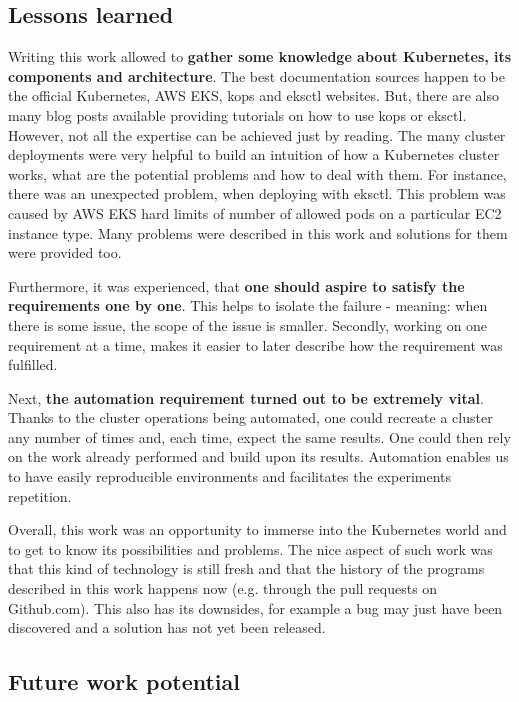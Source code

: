 \subsection{Lessons learned}

Writing this work allowed to \textbf{gather some knowledge about Kubernetes, its components and architecture}. The best documentation sources happen to be the official Kubernetes, AWS EKS, kops and eksctl websites. But, there are also many blog posts available providing tutorials on how to use kops or eksctl. However, not all the expertise can be achieved just by reading. The many cluster deployments were very helpful to build an intuition of how a Kubernetes cluster works, what are the potential problems and how to deal with them. For instance, there was an unexpected problem, when deploying with eksctl. This problem was caused by AWS EKS hard limits of number of  allowed pods on a particular EC2 instance type. Many problems were described in this work and solutions for them were provided too.

Furthermore, it was experienced, that \textbf{one should aspire to satisfy the requirements one by one}. This helps to isolate the failure - meaning: when there is some issue, the scope of the issue is smaller. Secondly, working on one requirement at a time, makes it easier to later describe how the requirement was fulfilled.

Next, \textbf{the automation requirement turned out to be extremely vital}. Thanks to the cluster operations being automated, one could recreate a cluster any number of times and, each time, expect the same results. One could then rely on the work already performed and build upon its results. Automation enables us to have easily reproducible environments and facilitates the experiments repetition.

Overall, this work was an opportunity to immerse into the Kubernetes world and to get to know its possibilities and problems. The nice aspect of such work was that this kind of technology is still fresh and that the history of the programs described in this work happens now (e.g. through the pull requests on Github.com). This also has its downsides, for example a bug may just have been discovered and a solution has not yet been released.

\subsection{Future work potential}

